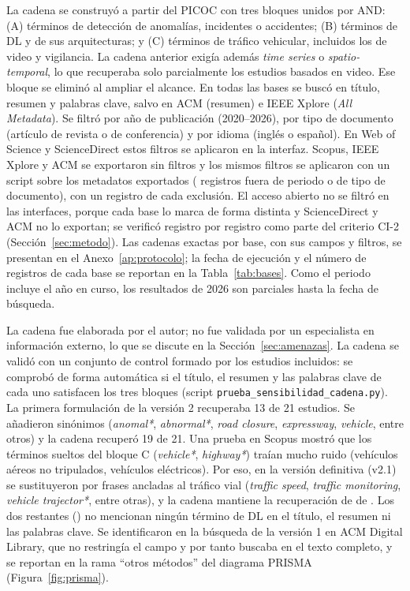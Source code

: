 \documentclass[12pt, a4paper]{article}
\begin{document}
La cadena se construy\'{o} a partir del PICOC con tres bloques unidos por AND: (A) t\'{e}rminos de detecci\'{o}n de anomal\'{i}as, incidentes o accidentes; (B) t\'{e}rminos de DL y de sus arquitecturas; y (C) t\'{e}rminos de tr\'{a}fico vehicular, incluidos los de video y vigilancia. La cadena anterior exig\'{i}a adem\'{a}s \textit{time series} o \textit{spatio-temporal}, lo que recuperaba solo parcialmente los estudios basados en video. Ese bloque se elimin\'{o} al ampliar el alcance. En todas las bases se busc\'{o} en t\'{i}tulo, resumen y palabras clave, salvo en ACM (resumen) e IEEE Xplore (\textit{All Metadata}). Se filtr\'{o} por a\~{n}o de publicaci\'{o}n (2020--2026), por tipo de documento (art\'{i}culo de revista o de conferencia) y por idioma (ingl\'{e}s o espa\~{n}ol). En Web of Science y ScienceDirect estos filtros se aplicaron en la interfaz. Scopus, IEEE Xplore y ACM se exportaron sin filtros y los mismos filtros se aplicaron con un script sobre los metadatos exportados (\NFueraFiltros{} registros fuera de periodo o de tipo de documento), con un registro de cada exclusi\'{o}n. El acceso abierto no se filtr\'{o} en las interfaces, porque cada base lo marca de forma distinta y ScienceDirect y ACM no lo exportan; se verific\'{o} registro por registro como parte del criterio CI-2 (Secci\'{o}n~\ref{sec:metodo}). Las cadenas exactas por base, con sus campos y filtros, se presentan en el Anexo~\ref{ap:protocolo}; la fecha de ejecuci\'{o}n y el n\'{u}mero de registros de cada base se reportan en la Tabla~\ref{tab:bases}. Como el periodo incluye el a\~{n}o en curso, los resultados de 2026 son parciales hasta la fecha de b\'{u}squeda.

La cadena fue elaborada por el autor; no fue validada por un especialista en informaci\'{o}n externo, lo que se discute en la Secci\'{o}n~\ref{sec:amenazas}. La cadena se valid\'{o} con un conjunto de control formado por los estudios incluidos: se comprob\'{o} de forma autom\'{a}tica si el t\'{i}tulo, el resumen y las palabras clave de cada uno satisfacen los tres bloques (script \texttt{prueba\_sensibilidad\_cadena.py}). La primera formulaci\'{o}n de la versi\'{o}n 2 recuperaba 13 de 21 estudios. Se a\~{n}adieron sin\'{o}nimos (\textit{anomal*}, \textit{abnormal*}, \textit{road closure}, \textit{expressway}, \textit{vehicle}, entre otros) y la cadena recuper\'{o} 19 de 21. Una prueba en Scopus mostr\'{o} que los t\'{e}rminos sueltos del bloque C (\textit{vehicle*}, \textit{highway*}) tra\'{i}an mucho ruido (veh\'{i}culos a\'{e}reos no tripulados, veh\'{i}culos el\'{e}ctricos). Por eso, en la versi\'{o}n definitiva (v2.1) se sustituyeron por frases ancladas al tr\'{a}fico vial (\textit{traffic speed}, \textit{traffic monitoring}, \textit{vehicle trajector*}, entre otras), y la cadena mantiene la recuperaci\'{o}n de \NsensibOK{} de \Nestudios{}. Los dos restantes (\IDsensibNo) no mencionan ning\'{u}n t\'{e}rmino de DL en el t\'{i}tulo, el resumen ni las palabras clave. Se identificaron en la b\'{u}squeda de la versi\'{o}n 1 en ACM Digital Library, que no restring\'{i}a el campo y por tanto buscaba en el texto completo, y se reportan en la rama ``otros m\'{e}todos'' del diagrama PRISMA (Figura~\ref{fig:prisma}).
\end{document}
